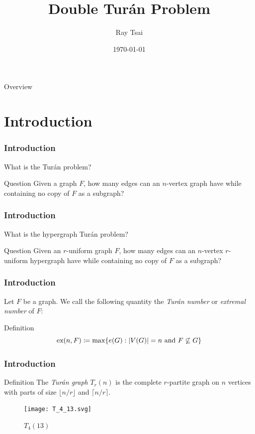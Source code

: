 \documentclass{beamer}
\title{Double Turán Problem}
\author{Ray Tsai}
\date{\today}
\newcommand*{\ex}{\textnormal{ex}}
\begin{document}
\frame{\titlepage}

\begin{frame}{Overview}
  \tableofcontents
\end{frame}

\section{Introduction}

\begin{frame}
\frametitle{Introduction}
What is the Turán problem? \pause

\begin{block}{Question}
  Given a graph $F$, how many edges can an $n$-vertex graph have while containing no copy of $F$ as a subgraph?
\end{block}
\end{frame}

\begin{frame}
\frametitle{Introduction}
What is the hypergraph Turán problem? 

\begin{block}{Question}
  Given an $r$-uniform graph $F$, how many edges can an $n$-vertex $r$-uniform hypergraph have while containing no copy of $F$ as a subgraph?
\end{block}
\end{frame}

\begin{frame}
\frametitle{Introduction}

Let $F$ be a graph. We call the following quantity the \textit{Turán number} or \textit{extremal number} of $F$:

\begin{block}{Definition}
  \[
    \ex(n, F) \coloneq \max \{ e(G) : |V(G)| = n \text{ and } F \not\subseteq G \}
  \]
\end{block}
\end{frame}

\begin{frame}
  \frametitle{Introduction}

  \begin{block}{Definition}
    The \textit{Turán graph} $T_r(n)$ is the complete $r$-partite graph on $n$ vertices with parts of size $\lfloor n/r \rfloor$ and $\lceil n/r \rceil$.
  \end{block}

  \pause

  \begin{figure}
    \centering
    \texttt{[image: T\_4\_13.svg]}
    \caption{$T_{4}(13)$}
  \end{figure}
\end{frame}
\end{document}
